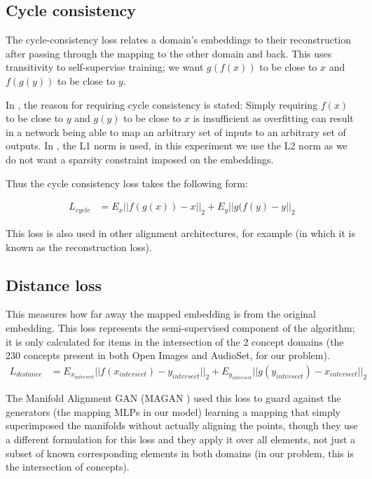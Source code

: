 \subsection{Cycle consistency}

The cycle-consistency loss relates a domain's embeddings to their reconstruction after passing through the mapping to the other domain and back. This uses transitivity to self-supervise training; we want $g(f(x))$ to be close to $x$ and $f(g(y))$ to be close to $y$. 

In \cite{CycleGAN}, the reason for requiring cycle consistency is stated: Simply requiring $f(x)$ to be close to $y$ and $g(y)$ to be close to $x$ is insufficient as overfitting can result in a network being able to map an arbitrary set of inputs to an arbitrary set of outputs. In \cite{CycleGAN}, the L1 norm is used, in this experiment we use the L2 norm as we do not want a sparsity constraint imposed on the embeddings. 

Thus the cycle consistency loss takes the following form:

\begin{equation}
\begin{split}
L_{cycle} &= E_x ||f(g(x)) - x||_2 + E_y ||g(f(y) - y||_2
\end{split}
\end{equation}

This loss is also used in other alignment architectures, for example \cite{magan} (in which it is known as the reconstruction loss). 

\subsection{Distance loss}

This measures how far away the mapped embedding is from the original embedding. This loss represents the semi-supervised component of the algorithm; it is only calculated for items in the intersection of the 2 concept domains (the 230 concepts present in both Open Images and AudioSet, for our problem). 
\begin{equation}
\begin{split}
L_{distance} &= E_{x_{intersect}}||f(x_{intersect}) - y_{intersect}||_2 + E_{y_{intersect}}||g(y_{intersect}) - x_{intersect}||_2
\end{split}
\end{equation}

The Manifold Alignment GAN (MAGAN \cite{magan}) used this loss to guard against the generators (the mapping MLPs in our model) learning a mapping that simply superimposed the manifolds without actually aligning the points, though they use a different formulation for this loss and they apply it over all elements, not just a subset of known corresponding elements in both domains (in our problem, this is the intersection of concepts). 

